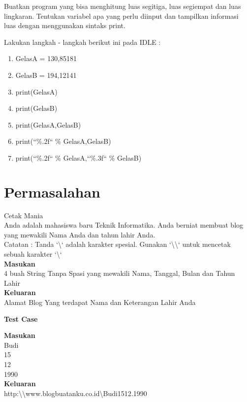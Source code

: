 \begin{latihan}
Buatkan program yang bisa menghitung luas segitiga, luas segiempat dan luas lingkaran. Tentukan variabel apa yang perlu diinput dan tampilkan informasi luas dengan menggunakan sintaks print.
\end{latihan}

\begin{latihan}
\label{latihan:Gelas}
Lakukan langkah - langkah berikut ini pada IDLE : 
\begin{enumerate}
	\item GelasA = 130,85181
	\item GelasB = 194,12141
	\item print(GelasA)
	\item print(GelasB)
	\item print(GelasA,GelasB)
	\item print(``\%.2f`` \% GelasA,GelasB)
	\item print(``\%.2f`` \% GelasA,``\%.3f`` \% GelasB)
\end{enumerate}
\end{latihan}

\newpage
\section{Permasalahan}
\begin{permasalahan}{Cetak Mania}\\
\label{prob:CetakMania}
Anda adalah mahasiswa baru Teknik Informatika. Anda berniat membuat blog yang mewakili Nama Anda dan tahun lahir Anda.\\
Catatan : Tanda `\textbackslash` adalah karakter spesial. Gunakan `\textbackslash\textbackslash` untuk mencetak sebuah karakter `\textbackslash` \\
	\textbf{Masukan}\\
	4 buah String Tanpa Spasi yang mewakili Nama, Tanggal, Bulan dan Tahun Lahir \\
	\textbf{Keluaran}\\
	Alamat Blog Yang terdapat Nama dan Keterangan Lahir Anda \\
	\begin{center}
	\textbf{Test Case}\\
	\end{center}
	\textbf{Masukan}\\
	Budi \\
	15 \\
	12 \\
	1990 \\
	\textbf{Keluaran}\\
	http:\textbackslash\textbackslash www.blogbuatanku.co.id\textbackslash Budi1512.1990 \\	
\end{permasalahan}

